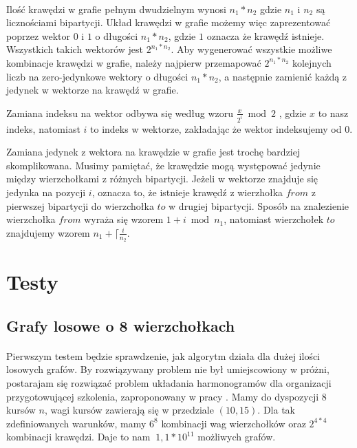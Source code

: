 \documentclass{article}
\begin{document}
\paragraph{} Ilość krawędzi w grafie pełnym dwudzielnym wynosi $n_1 * n_2$ gdzie $n_1$ i $n_2$ są licznościami bipartycji. Układ krawędzi w grafie możemy więc zaprezentować poprzez wektor $0$ i $1$ o długości $n_1 * n_2$, gdzie $1$ oznacza że krawędź istnieje. Wszystkich takich wektorów jest $2^{n_1*n_2}$. Aby wygenerować wszystkie możliwe kombinacje krawędzi w grafie, należy najpierw przemapować $2^{n_1*n_2}$ kolejnych liczb na zero-jedynkowe wektory o długości $n_1 * n_2$, a następnie zamienić każdą z jedynek w wektorze na krawędź w grafie. 

Zamiana indeksu na wektor odbywa się według wzoru $\frac{x}{2^{i}}\bmod 2$ , gdzie $x$ to nasz indeks, natomiast $i$ to indeks w wektorze, zakładając że wektor indeksujemy od $0$.

Zamiana jedynek z wektora na krawędzie w grafie jest trochę bardziej skomplikowana. Musimy pamiętać, że krawędzie mogą występować jedynie między wierzchołkami z różnych bipartycji. Jeżeli w wektorze znajduje się jedynka na pozycji $i$, oznacza to, że istnieje krawędź z wierzhołka $from$ z pierwszej bipartycji do wierzchołka $to$ w drugiej bipartycji. Sposób na znalezienie wierzchołka $from$ wyraża się wzorem $1 + i\bmod n_1$, natomiast wierzchołek $to$ znajdujemy wzorem $n_1 + \lceil{\frac{i}{n_2}}$.

\section{Testy}

\subsection{Grafy losowe o 8 wierzchołkach}

\paragraph{} Pierwszym testem będzie sprawdzenie, jak algorytm działa dla dużej ilości losowych grafów. By rozwiązywany problem nie był umiejscowiony w próżni, postarajam się rozwiązać problem układania harmonogramów dla organizacji przygotowującej szkolenia, zaproponowany w pracy \cite{kubale-pikies19}. Mamy do dyspozycji 8 kursów $n$, wagi kursów zawierają się w przedziale $(10,15)$. Dla tak zdefiniowanych warunków, mamy $6^8$ kombinacji wag wierzchołków oraz $2^{4*4}$ kombinacji krawędzi. Daje to nam $~1,1*10^{11}$ możliwych grafów.
\end{document}
